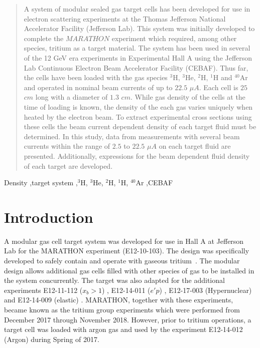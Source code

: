 \documentclass[final,5p,times,twocolumn]{elsarticle}
\begin{document}
\begin{frontmatter}
\begin{abstract}
A system of modular sealed gas target cells has been developed for use in electron scattering experiments 
at the Thomas Jefferson National Accelerator Facility (Jefferson Lab). This system was initially developed 
to complete the $MARATHON$ experiment which required, among other species, tritium as a target material. 
The system has been used in several of the 12 GeV era experiments in Experimental Hall A using the Jefferson Lab 
Continuous Electron Beam Accelerator Facility (CEBAF). Thus far, the cells have been loaded with the gas 
species $^{3}$H, $^{3}$He, $^{2}$H, $^{1}$H and $^{40}$Ar and operated in nominal beam currents of up to $22.5$ $\mu A$.  
Each cell is $25$ $cm$ long with a diameter of $1.3$ $cm$. While gas density of the cells at the time of loading is known, 
the density of the each gas varies uniquely when heated by the electron beam. To extract experimental cross sections using 
these cells the beam current dependent density of each target fluid must be determined. In this study, data from measurements 
with several beam currents within the range of $2.5$ to $22.5$ $\mu A$ on each target fluid are presented. Additionally, 
expressions for the beam dependent fluid density of each target are developed.
\end{abstract}

\begin{keyword}
Density \sep target system
\sep $^{3}$H, $^{3}$He, $^{2}$H, $^{1}$H, $^{40}$Ar
\sep CEBAF
\end{keyword}
\end{frontmatter}


\section{Introduction}
\label{}

A modular gas cell target system was developed for use in Hall A at Jefferson Lab for the MARATHON experiment (E12-10-103)\cite{marathon}. The design was specifically developed to safely contain and operate with gaseous tritium~\cite{Braj:2013}. The modular design allows additional gas cells filled with other species of gas to be installed in the system concurrently. The target was also adapted for the additional experiments E12-11-112 ($x_{b}>1$) \cite{E12-11-112}, E12-14-011 ($e'p$) \cite{E12-14-011}, E12-17-003 (Hypernuclear) \cite{hypernuclear} and E12-14-009 (elastic) \cite{E12-14-009}.  MARATHON, together with these experiments, became known as the tritium group experiments which were performed from December 2017 through November 2018. However, prior to tritium operations, a target cell was loaded with argon gas and used by the experiment E12-14-012 (Argon) \cite{E12-14-012} during Spring of 2017. 
\end{document}
